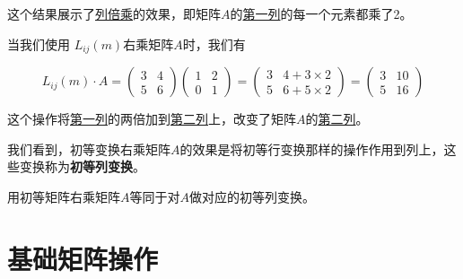 \begin{exercise}
这个结果展示了\underline{列倍乘}的效果，即矩阵\(A\)的\underline{第一列}的每一个元素都乘了2。

当我们使用 $L_{ij}(m) $右乘矩阵\(A\)时，我们有

\[ L_{ij}(m) \cdot A = \begin{pmatrix} 3 & 4 \\ 5 & 6 \end{pmatrix} \begin{pmatrix} 1 & 2 \\ 0 & 1 \end{pmatrix} = \begin{pmatrix} 3 & 4 + 3 \times 2 \\ 5 & 6 + 5 \times 2 \end{pmatrix} = \begin{pmatrix} 3 & 10 \\ 5 & 16 \end{pmatrix} \]

这个操作将\underline{第一列}的两倍加到\underline{第二列}上，改变了矩阵\(A\)的\underline{第二列}。

\end{exercise}

我们看到，初等变换右乘矩阵$A$的效果是将初等行变换那样的操作作用到列上，这些变换称为\textcolor{third}{\bf 初等列变换}。

\vspace{0.2cm}

\begin{note}
    用初等矩阵右乘矩阵$A$等同于对$A$做对应的初等列变换。
\end{note}

\vspace{0.2cm}



\section{基础矩阵操作}

